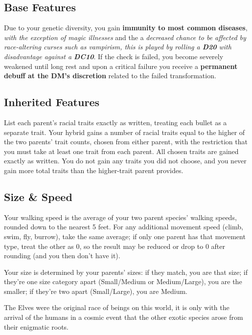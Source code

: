 \documentclass[letterpaper,twocolumn,openany,nodeprecatedcode,breakable,skins,xparse,most]{dndbook}
\begin{document}
\subsection{Base Features}
Due to your genetic diversity, you gain \textbf{immunity to most common diseases},\textit{ with the exception of magic illnesses} and the a \textit{decreased chance to be affected by race-altering curses such as vampirism, this is played by rolling a \textbf{D20} with disadvantage against a \textbf{DC10}}. If the check is failed, you become severely weakened until long rest and upon a critical failure you receive a \textbf{permanent debuff at the DM's discretion} related to the failed transformation.

\subsection{Inherited Features}
List each parent’s racial traits exactly as written, treating each bullet as a separate trait. Your hybrid gains a number of racial traits equal to the higher of the two parents’ trait counts, chosen from either parent, with the restriction that you must take at least one trait from each parent. All chosen traits are gained exactly as written. You do not gain any traits you did not choose, and you never gain more total traits than the higher-trait parent provides.

\subsection{Size \& Speed}
Your walking speed is the average of your two parent species' walking speeds, rounded down to the nearest 5 feet. For any additional movement speed (climb, swim, fly, burrow), take the same average; if only one parent has that movement type, treat the other as 0, so the result may be reduced or drop to 0 after rounding (and you then don't have it).

Your size is determined by your parents' sizes: if they match, you are that size; if they're one size category apart (Small/Medium or Medium/Large), you are the smaller; if they're two apart (Small/Large), you are Medium.

\begin{DndReadAloud}
   The Elves were the original race of beings on this world, it is only with the arrival of the humans in a cosmic event that the other exotic species arose from their enigmatic roots.
\end{DndReadAloud}
\end{document}

